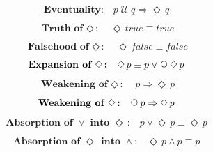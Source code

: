 \documentclass[12pt, fleqn, leqno]{article}
\newcommand{\impl}{\ensuremath{\Rightarrow}}        %
\newcommand{\Until}{\;\mathcal{U}\;}
\newcommand{\Next}{\;\,\text{\raisebox{3.5pt}{\circle{6}}}}
\newcommand{\Event}{\Diamond\,}
\newcommand{\spacer}{\vspace{-30pt}}
\begin{document}
\spacer

\begin{equation}\label{E:eventuality}
\textbf{Eventuality:}\quad p \Until q \impl \Event q
\end{equation}

\spacer

\begin{equation}\label{E:eventTrue}
\textbf{Truth of $\Event$:}\quad \Event true \equiv true
\end{equation}

\spacer

\begin{equation}\label{E:eventFalse}
\textbf{Falsehood of $\Event$:}\quad \Event false \equiv false
\end{equation}

\spacer

\begin{equation}\label{E:expansionEvent}
\textbf{Expansion of $\Event$:}\quad \Event p \equiv p \lor \Next\Event p
\end{equation}

\spacer

\begin{equation}\label{E:impEvent}
\textbf{Weakening of $\Event$:}\quad p \impl \Event p
\end{equation}

\spacer

\begin{equation}\label{E:nextEvent}
\textbf{Weakening of $\Event$:}\quad \Next p \impl \Event p
\end{equation}

\spacer

\begin{equation}\label{E:absOrIntoEvent}
\textbf{Absorption of $\lor$ into $\Event$:}\quad p \lor \Event p \equiv \Event p
\end{equation}

\spacer

\begin{equation}\label{E:absEventIntoAnd}
\textbf{Absorption of $\Event$ into $\land$:}\quad \Event p \land p \equiv p
\end{equation}
\end{document}

